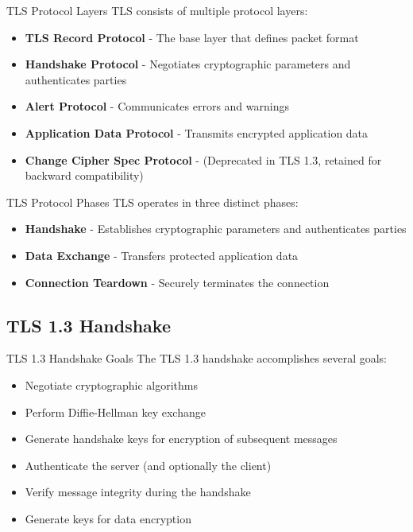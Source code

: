 \begin{concept}{TLS Protocol Layers}
TLS consists of multiple protocol layers:
\begin{itemize}
    \item \textbf{TLS Record Protocol} - The base layer that defines packet format
    \item \textbf{Handshake Protocol} - Negotiates cryptographic parameters and authenticates parties
    \item \textbf{Alert Protocol} - Communicates errors and warnings
    \item \textbf{Application Data Protocol} - Transmits encrypted application data
    \item \textbf{Change Cipher Spec Protocol} - (Deprecated in TLS 1.3, retained for backward compatibility)
\end{itemize}
\end{concept}

\begin{definition}{TLS Protocol Phases}
TLS operates in three distinct phases:
\begin{itemize}
    \item \textbf{Handshake} - Establishes cryptographic parameters and authenticates parties
    \item \textbf{Data Exchange} - Transfers protected application data
    \item \textbf{Connection Teardown} - Securely terminates the connection
\end{itemize}
\end{definition}

\subsection{TLS 1.3 Handshake}

\begin{concept}{TLS 1.3 Handshake Goals}
The TLS 1.3 handshake accomplishes several goals:
\begin{itemize}
    \item Negotiate cryptographic algorithms
    \item Perform Diffie-Hellman key exchange
    \item Generate handshake keys for encryption of subsequent messages
    \item Authenticate the server (and optionally the client)
    \item Verify message integrity during the handshake
    \item Generate keys for data encryption
\end{itemize}
\end{concept}

